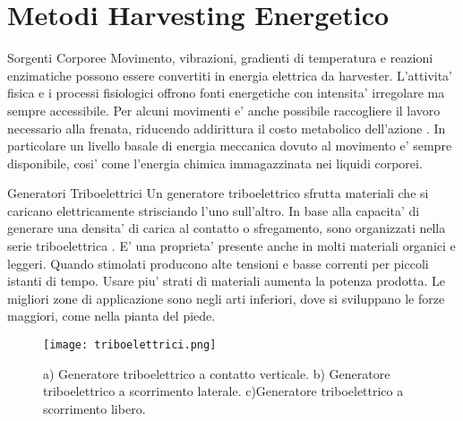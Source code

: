 \chapter{Metodi Harvesting Energetico}

\begin{section}{Sorgenti Corporee}
   Movimento, vibrazioni, gradienti di temperatura e reazioni enzimatiche possono essere convertiti in energia elettrica da harvester. L'attivita' fisica e i processi fisiologici offrono fonti energetiche con intensita' irregolare ma sempre accessibile. Per alcuni movimenti e' anche possibile raccogliere il lavoro necessario alla frenata, riducendo addirittura il costo metabolico dell'azione \cite{liuBiomechanicalEnergyHarvesting2022}. In particolare un livello basale di energia meccanica dovuto al movimento e' sempre disponibile, cosi' come l'energia chimica immagazzinata nei liquidi corporei.
   
   \begin{subsection}{Generatori Triboelettrici}
    Un generatore triboelettrico sfrutta materiali che si caricano elettricamente strisciando l'uno sull'altro. In base alla capacita' di generare una densita' di carica al contatto o sfregamento, sono organizzati nella serie triboelettrica \cite{zouQuantifyingTriboelectricSeries2019}. E' una proprieta' presente anche in molti materiali organici e leggeri. Quando stimolati producono alte tensioni e basse correnti per piccoli istanti di tempo. Usare piu' strati di materiali aumenta la potenza prodotta. Le migliori zone di applicazione sono negli arti inferiori, dove si sviluppano le forze maggiori, come nella pianta del piede.
    \begin{figure}[H]
        \texttt{[image: triboelettrici.png]}
        \centering
        \caption{a) Generatore triboelettrico a contatto verticale. b) Generatore triboelettrico a scorrimento laterale. c)Generatore triboelettrico a scorrimento libero.}
        \label{fig:triboelettrici}
    \end{figure}
   \end{subsection}


\end{section}
